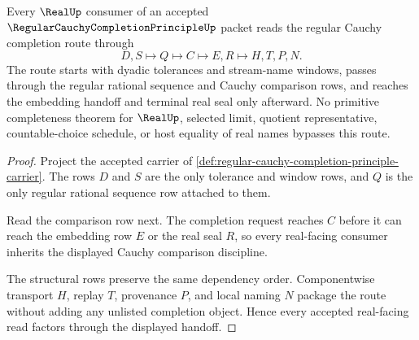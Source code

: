 \begin{theorem}
\label{thm:regular-cauchy-completion-principle-embedding-handoff}
Every $\RealUp$ consumer of an accepted $\RegularCauchyCompletionPrincipleUp$ packet reads the regular Cauchy completion route through
$$
D,S \longmapsto Q \longmapsto C \longmapsto E,R \longmapsto H,T,P,N .
$$
The route starts with dyadic tolerances and stream-name windows, passes through the regular rational sequence and Cauchy comparison rows, and reaches the embedding handoff and terminal real seal only afterward. No primitive completeness theorem for $\RealUp$, selected limit, quotient representative, countable-choice schedule, or host equality of real names bypasses this route.
\end{theorem}
\begin{proof}
Project the accepted carrier of \autoref{def:regular-cauchy-completion-principle-carrier}. The rows $D$ and $S$ are the only tolerance and window rows, and $Q$ is the only regular rational sequence row attached to them.

Read the comparison row next. The completion request reaches $C$ before it can reach the embedding row $E$ or the real seal $R$, so every real-facing consumer inherits the displayed Cauchy comparison discipline.

The structural rows preserve the same dependency order. Componentwise transport $H$, replay $T$, provenance $P$, and local naming $N$ package the route without adding any unlisted completion object. Hence every accepted real-facing read factors through the displayed handoff.
\end{proof}


\begin{closurestatus}{\RegularCauchyCompletionPrincipleUp}
  \theoryclosure{\seedClosure}
  \formalstatus{\unformalizedV}
\end{closurestatus}
